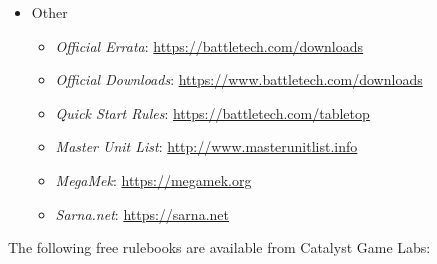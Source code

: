 \begin{itemize}
\begin{itemize}
    \item \emph{\href{https://store.catalystgamelabs.com/products/battletech-chaos-campaign-succession-wars}{BattleTech: Chaos Campaign: Succession Wars}}

    \item \emph{\href{https://store.catalystgamelabs.com/products/battletech-mercenaries-box-set}{BattleTech: Mercenaries Box Set}}

    \item \emph{\href{https://store.catalystgamelabs.com/products/battletech-hot-spots-hinterlands}{BattleTech: Hot Spots: Hinterlands}}

    \item \emph{\href{https://store.catalystgamelabs.com/products/battletech-hot-spots-draconis-reach}{BattleTech: Hot Spots: Draconis Reach}}

  \end{itemize}

  \item Other

  \begin{itemize}

    \item \emph{Official Errata}: \href{https://battletech.com/downloads}{https://battletech.com/downloads}

    \item \emph{Official Downloads}: \href{https://www.battletech.com/downloads}{https://www.battletech.com/downloads}

    \item \emph{Quick Start Rules}: \href{https://battletech.com/tabletop}{https://battletech.com/tabletop}

    \item \emph{Master Unit List}: \href{http://www.masterunitlist.info}{http://www.masterunitlist.info}

    \item \emph{MegaMek}: \href{https://megamek.org}{https://megamek.org}

    \item \emph{Sarna.net}: \href{https://sarna.net}{https://sarna.net}

  \end{itemize}

\end{itemize}

The following free rulebooks are available from Catalyst Game Labs:

